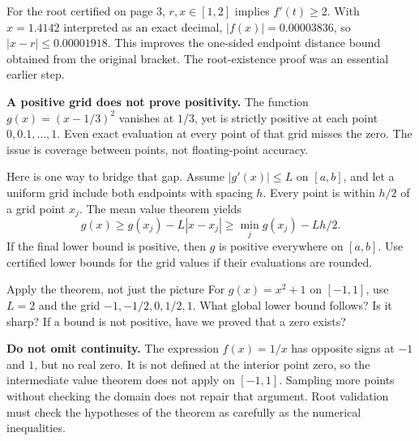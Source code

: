 For the root certified on page 3, $r,x\in[1,2]$ implies $f'(t)\ge2$. With
$x=1.4142$ interpreted as an exact decimal, $|f(x)|=0.00003836$, so
$|x-r|\le0.00001918$. This improves the one-sided endpoint distance bound obtained
from the original bracket. The root-existence proof was an essential earlier step.

\textbf{A positive grid does not prove positivity.} The function
$g(x)=(x-1/3)^2$ vanishes at $1/3$, yet is strictly positive at each point
$0,0.1,\ldots,1$. Even exact evaluation at every point of that grid misses the zero.
The issue is coverage between points, not floating-point accuracy.

Here is one way to bridge that gap. Assume $|g'(x)|\le L$ on $[a,b]$, and let a
uniform grid include both endpoints with spacing $h$. Every point is within $h/2$
of a grid point $x_j$. The mean value theorem yields
\[
 g(x)\ge g(x_j)-L|x-x_j|\ge \min_j g(x_j)-Lh/2.
\]
If the final lower bound is positive, then $g$ is positive everywhere on $[a,b]$.
Use certified lower bounds for the grid values if their evaluations are rounded.

\begin{question}{Apply the theorem, not just the picture}
For $g(x)=x^2+1$ on $[-1,1]$, use $L=2$ and the grid
$-1,-1/2,0,1/2,1$. What global lower bound follows? Is it sharp?
If a bound is not positive, have we proved that a zero exists?
\end{question}

\textbf{Do not omit continuity.} The expression $f(x)=1/x$ has opposite signs
at $-1$ and $1$, but no real zero. It is not defined at the interior point zero,
so the intermediate value theorem does not apply on $[-1,1]$. Sampling more points
without checking the domain does not repair that argument. Root validation must
check the hypotheses of the theorem as carefully as the numerical inequalities.

